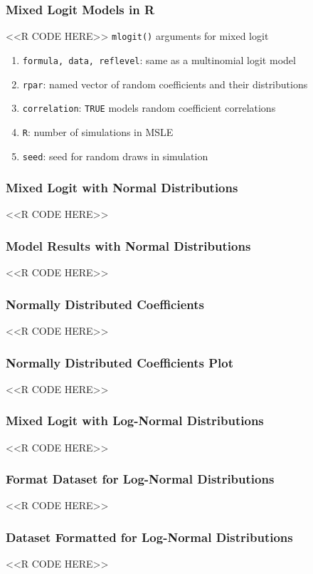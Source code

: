 \documentclass{beamer}
\begin{document}
\begin{frame}[fragile]\frametitle{Mixed Logit Models in R}
    <<R CODE HERE>>
    \vspace{2ex}
    \texttt{mlogit()} arguments for mixed logit
    \begin{enumerate}
        \item \texttt{formula, data, reflevel}: same as a multinomial logit model
        \item \texttt{rpar}: named vector of random coefficients and their distributions
        \item \texttt{correlation}: \texttt{TRUE} models random coefficient correlations
        \item \texttt{R}: number of simulations in MSLE
        \item \texttt{seed}: seed for random draws in simulation
    \end{enumerate}
\end{frame}

\begin{frame}[fragile]\frametitle{Mixed Logit with Normal Distributions}
    <<R CODE HERE>>
\end{frame}

\begin{frame}[fragile]\frametitle{Model Results with Normal Distributions}
    \vspace{1ex}
    <<R CODE HERE>>
\end{frame}

\begin{frame}[fragile]\frametitle{Normally Distributed Coefficients}
    <<R CODE HERE>>
\end{frame}

\begin{frame}[fragile]\frametitle{Normally Distributed Coefficients Plot}
    <<R CODE HERE>>
\end{frame}

\begin{frame}[fragile]\frametitle{Mixed Logit with Log-Normal Distributions}
    <<R CODE HERE>>
\end{frame}

\begin{frame}[fragile]\frametitle{Format Dataset for Log-Normal Distributions}
    <<R CODE HERE>>
\end{frame}

\begin{frame}[fragile]\frametitle{Dataset Formatted for Log-Normal Distributions}
    <<R CODE HERE>>
\end{frame}
\end{document}
